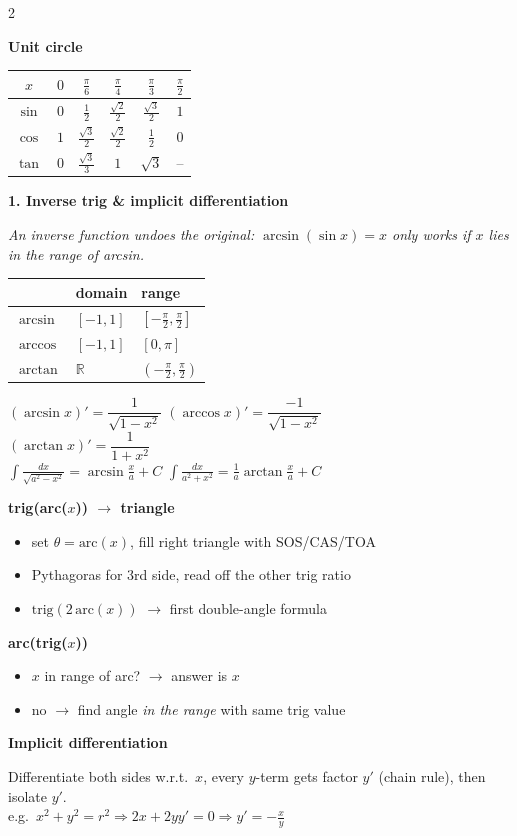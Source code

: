\documentclass[10pt]{article}
\newcommand{\sect}[2]{%
  \par\vspace{12pt}\noindent                      %
  \colorbox{#1}{\parbox{\dimexpr\columnwidth-2\fboxsep}{\color{white}\bfseries #2}}%
  \par\vspace{4pt}}                               %
\newcommand{\sub}[1]{\par\vspace{7pt}\textbf{#1}\par\vspace{2pt}}  %
\newcommand{\expl}[1]{{\color{gray!80!black}\itshape #1}\par}
\begin{document}
\begin{multicols}{2}
\sub{Unit circle}
\renewcommand{\arraystretch}{1.2}
\begin{tabular}{@{}c|ccccc@{}}
$x$ & $0$ & $\frac\pi6$ & $\frac\pi4$ & $\frac\pi3$ & $\frac\pi2$\\\hline
$\sin$ & $0$ & $\frac12$ & $\frac{\sqrt2}{2}$ & $\frac{\sqrt3}{2}$ & $1$\\
$\cos$ & $1$ & $\frac{\sqrt3}{2}$ & $\frac{\sqrt2}{2}$ & $\frac12$ & $0$\\
$\tan$ & $0$ & $\frac{\sqrt3}{3}$ & $1$ & $\sqrt3$ & --
\end{tabular}

\sect{cInt}{1. Inverse trig \& implicit differentiation}
\expl{An inverse function undoes the original: $\arcsin(\sin x)=x$ only works if $x$ lies in the range of arcsin.}
\renewcommand{\arraystretch}{1.25}
\begin{tabular}{@{}lll@{}}
 & domain & range\\\midrule
$\arcsin$ & $[-1,1]$ & $[-\frac\pi2,\frac\pi2]$\\
$\arccos$ & $[-1,1]$ & $[0,\pi]$\\
$\arctan$ & $\mathbb R$ & $(-\frac\pi2,\frac\pi2)$
\end{tabular}

$(\arcsin x)'=\dfrac{1}{\sqrt{1-x^2}}$ \quad $(\arccos x)'=\dfrac{-1}{\sqrt{1-x^2}}$\\[2pt]
$(\arctan x)'=\dfrac{1}{1+x^2}$\\[2pt]
$\int\frac{dx}{\sqrt{a^2-x^2}}=\arcsin\frac xa+C$ \quad
$\int\frac{dx}{a^2+x^2}=\frac1a\arctan\frac xa+C$

\sub{trig(arc($x$)) $\rightarrow$ triangle}
\begin{itemize}
  \item set $\theta=\text{arc}(x)$, fill right triangle with SOS/CAS/TOA
  \item Pythagoras for 3rd side, read off the other trig ratio
  \item $\text{trig}(2\,\text{arc}(x))$ $\rightarrow$ first double-angle formula
\end{itemize}
\sub{arc(trig($x$))}
\begin{itemize}
  \item $x$ in range of arc? $\rightarrow$ answer is $x$
  \item no $\rightarrow$ find angle \emph{in the range} with same trig value
\end{itemize}

\sub{Implicit differentiation}
Differentiate both sides w.r.t.\ $x$, every $y$-term gets factor $y'$ (chain rule), then isolate $y'$.\\
e.g.\ $x^2+y^2=r^2\Rightarrow 2x+2yy'=0\Rightarrow y'=-\frac xy$


\end{multicols}
\end{document}
